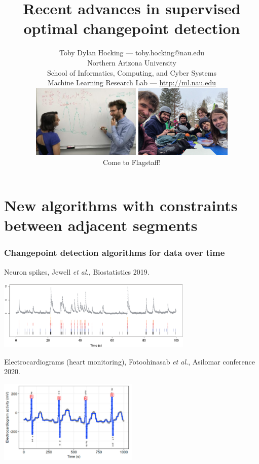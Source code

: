 \documentclass{beamer}
\begin{document}
\title{Recent advances in supervised optimal changepoint detection}

\author{
  Toby Dylan Hocking --- toby.hocking@nau.edu\\ 
  Northern Arizona University\\
  School of Informatics, Computing, and Cyber Systems\\
  Machine Learning Research Lab --- \url{http://ml.nau.edu}\\
  \includegraphics[height=3.5cm]{photo-atiyeh-whiteboard}
  \includegraphics[height=3.5cm]{2021-03-lab-ski-lunch} \\
  Come to Flagstaff! 
}

\date{}

\maketitle

\section{New algorithms with constraints between adjacent segments}
\begin{frame}
  \frametitle{Changepoint detection algorithms for data over time}
  Neuron spikes, Jewell \emph{et al.}, Biostatistics 2019.

  \includegraphics[width=0.7\textwidth]{intro-neuroscience} 

  Electrocardiograms (heart monitoring), 
  Fotoohinasab \emph{et al.}, 
  Asilomar conference 2020.

  \includegraphics[width=0.5\textwidth]{intro-ecg} 

\end{frame}
\end{document}
